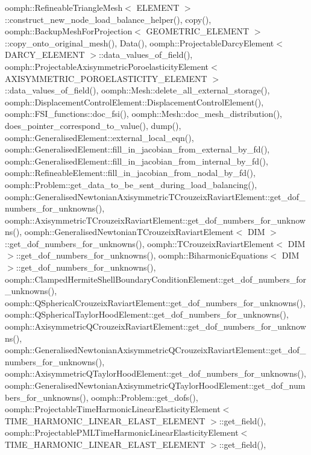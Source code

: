 oomph\+::\+Refineable\+Triangle\+Mesh$<$ E\+L\+E\+M\+E\+N\+T $>$\+::construct\+\_\+new\+\_\+node\+\_\+load\+\_\+balance\+\_\+helper(), copy(), oomph\+::\+Backup\+Mesh\+For\+Projection$<$ G\+E\+O\+M\+E\+T\+R\+I\+C\+\_\+\+E\+L\+E\+M\+E\+N\+T $>$\+::copy\+\_\+onto\+\_\+original\+\_\+mesh(), Data(), oomph\+::\+Projectable\+Darcy\+Element$<$ D\+A\+R\+C\+Y\+\_\+\+E\+L\+E\+M\+E\+N\+T $>$\+::data\+\_\+values\+\_\+of\+\_\+field(), oomph\+::\+Projectable\+Axisymmetric\+Poroelasticity\+Element$<$ A\+X\+I\+S\+Y\+M\+M\+E\+T\+R\+I\+C\+\_\+\+P\+O\+R\+O\+E\+L\+A\+S\+T\+I\+C\+I\+T\+Y\+\_\+\+E\+L\+E\+M\+E\+N\+T $>$\+::data\+\_\+values\+\_\+of\+\_\+field(), oomph\+::\+Mesh\+::delete\+\_\+all\+\_\+external\+\_\+storage(), oomph\+::\+Displacement\+Control\+Element\+::\+Displacement\+Control\+Element(), oomph\+::\+F\+S\+I\+\_\+functions\+::doc\+\_\+fsi(), oomph\+::\+Mesh\+::doc\+\_\+mesh\+\_\+distribution(), does\+\_\+pointer\+\_\+correspond\+\_\+to\+\_\+value(), dump(), oomph\+::\+Generalised\+Element\+::external\+\_\+local\+\_\+eqn(), oomph\+::\+Generalised\+Element\+::fill\+\_\+in\+\_\+jacobian\+\_\+from\+\_\+external\+\_\+by\+\_\+fd(), oomph\+::\+Generalised\+Element\+::fill\+\_\+in\+\_\+jacobian\+\_\+from\+\_\+internal\+\_\+by\+\_\+fd(), oomph\+::\+Refineable\+Element\+::fill\+\_\+in\+\_\+jacobian\+\_\+from\+\_\+nodal\+\_\+by\+\_\+fd(), oomph\+::\+Problem\+::get\+\_\+data\+\_\+to\+\_\+be\+\_\+sent\+\_\+during\+\_\+load\+\_\+balancing(), oomph\+::\+Generalised\+Newtonian\+Axisymmetric\+T\+Crouzeix\+Raviart\+Element\+::get\+\_\+dof\+\_\+numbers\+\_\+for\+\_\+unknowns(), oomph\+::\+Axisymmetric\+T\+Crouzeix\+Raviart\+Element\+::get\+\_\+dof\+\_\+numbers\+\_\+for\+\_\+unknowns(), oomph\+::\+Generalised\+Newtonian\+T\+Crouzeix\+Raviart\+Element$<$ D\+I\+M $>$\+::get\+\_\+dof\+\_\+numbers\+\_\+for\+\_\+unknowns(), oomph\+::\+T\+Crouzeix\+Raviart\+Element$<$ D\+I\+M $>$\+::get\+\_\+dof\+\_\+numbers\+\_\+for\+\_\+unknowns(), oomph\+::\+Biharmonic\+Equations$<$ D\+I\+M $>$\+::get\+\_\+dof\+\_\+numbers\+\_\+for\+\_\+unknowns(), oomph\+::\+Clamped\+Hermite\+Shell\+Boundary\+Condition\+Element\+::get\+\_\+dof\+\_\+numbers\+\_\+for\+\_\+unknowns(), oomph\+::\+Q\+Spherical\+Crouzeix\+Raviart\+Element\+::get\+\_\+dof\+\_\+numbers\+\_\+for\+\_\+unknowns(), oomph\+::\+Q\+Spherical\+Taylor\+Hood\+Element\+::get\+\_\+dof\+\_\+numbers\+\_\+for\+\_\+unknowns(), oomph\+::\+Axisymmetric\+Q\+Crouzeix\+Raviart\+Element\+::get\+\_\+dof\+\_\+numbers\+\_\+for\+\_\+unknowns(), oomph\+::\+Generalised\+Newtonian\+Axisymmetric\+Q\+Crouzeix\+Raviart\+Element\+::get\+\_\+dof\+\_\+numbers\+\_\+for\+\_\+unknowns(), oomph\+::\+Axisymmetric\+Q\+Taylor\+Hood\+Element\+::get\+\_\+dof\+\_\+numbers\+\_\+for\+\_\+unknowns(), oomph\+::\+Generalised\+Newtonian\+Axisymmetric\+Q\+Taylor\+Hood\+Element\+::get\+\_\+dof\+\_\+numbers\+\_\+for\+\_\+unknowns(), oomph\+::\+Problem\+::get\+\_\+dofs(), oomph\+::\+Projectable\+Time\+Harmonic\+Linear\+Elasticity\+Element$<$ T\+I\+M\+E\+\_\+\+H\+A\+R\+M\+O\+N\+I\+C\+\_\+\+L\+I\+N\+E\+A\+R\+\_\+\+E\+L\+A\+S\+T\+\_\+\+E\+L\+E\+M\+E\+N\+T $>$\+::get\+\_\+field(), oomph\+::\+Projectable\+P\+M\+L\+Time\+Harmonic\+Linear\+Elasticity\+Element$<$ T\+I\+M\+E\+\_\+\+H\+A\+R\+M\+O\+N\+I\+C\+\_\+\+L\+I\+N\+E\+A\+R\+\_\+\+E\+L\+A\+S\+T\+\_\+\+E\+L\+E\+M\+E\+N\+T $>$\+::get\+\_\+field(), 